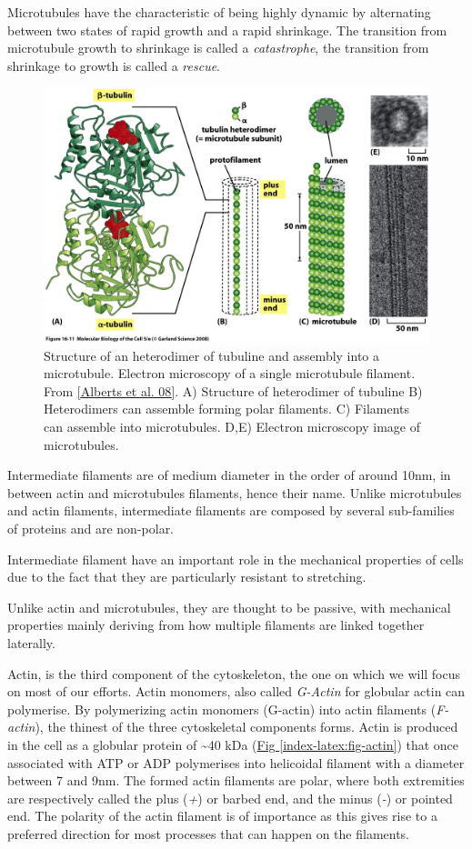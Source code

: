 \documentclass[A4paperpaper,11pt,english]{sphinxmanual}
\begin{document}
Microtubules have the characteristic of being highly dynamic by alternating
between two states of rapid growth and a rapid shrinkage. The transition from
microtubule growth to shrinkage is called a \emph{catastrophe}, the transition from
shrinkage to growth is called a \emph{rescue}.
\begin{figure}[htbp]
\centering
\capstart

\includegraphics[width=0.700\linewidth]{microtubules-structure.jpg}
\caption{Structure of an heterodimer of tubuline and assembly into a microtubule.
Electron microscopy of a single microtubule filament. From {\hyperref[index-latex:alberts2008]{{[}Alberts et al. 08{]}}}.
A) Structure of heterodimer of tubuline B)
Heterodimers can assemble forming polar filaments. C) Filaments can
assemble into  microtubules. D,E) Electron microscopy image of
microtubules.}\label{index-latex:fig-mt}\end{figure}

Intermediate filaments are of medium diameter in the order of around 10nm, in
between actin and microtubules filaments, hence their name.  Unlike microtubules
and actin filaments, intermediate filaments are composed by several sub-families
of proteins and are non-polar.

Intermediate filament have an important role in the mechanical properties of
cells due to the fact that they are particularly  resistant to stretching.

Unlike actin and microtubules, they are thought to be passive, with mechanical
properties mainly deriving from how multiple filaments are linked together
laterally.

Actin, is the third component of the cytoskeleton, the one on which  we will
focus on most of our efforts. Actin monomers, also called \emph{G-Actin} for globular actin can polymerise.
By polymerizing actin monomers (G-actin) into actin filaments (\emph{F-actin}), the
thinest of the three cytoskeletal components forms. Actin is produced in the
cell as a globular protein of \textasciitilde{}40 kDa (\hyperref[index-latex:fig-actin]{Fig  \ref*{index-latex:fig-actin}}) that once associated with ATP or ADP
polymerises into helicoidal filament with a diameter between 7 and 9nm. The
formed actin filaments are polar, where both extremities are respectively called the
plus (\emph{+}) or barbed end, and the minus (\emph{-}) or pointed end. The polarity of
the actin filament is of importance as this gives rise to a preferred direction
for most processes that can happen on the filaments.
\end{document}
